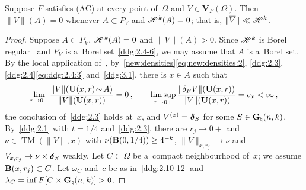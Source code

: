 \documentclass[a4paper,twoside,leqno]{article}
\newcommand{\Gk}{\pgrass{\adim}{\vdim}}        %
\DeclareMathOperator{\TM}{TM}                   %
\begin{document}
\begin{lemma}
    \label{ddg:3.4}
    Suppose $F$ satisfies (AC) at every point of~$\Omega$ and $V \in \mathbf{V}_F(\Omega)$. Then
    $\|V\|(A) = 0$ whenever $A \subset P_V$ and $\mathscr{H}^{k}(A) = 0$; that is, $\|\overline V\|
    \ll \mathscr{H}^{k}$.
\end{lemma}

\begin{proof}
    Suppose $A \subset P_V$, $\mathscr{H}^{k}(A) = 0$ and $\|V\|(A) > 0$. Since $\mathscr{H}^{k}$ is Borel
    regular~\cite[2.8(1)]{Allard1972} and $P_V$ is a~Borel set~\ref{ddg:2.4-6}, we may assume that
    $A$ is a~Borel set. By the local application of~\cite[2.8.18, 2.9.11]{Federer1969},
    by~\ref{new:densities}\eqref{eq:new:densities:2}, \ref{ddg:2.3}, \ref{ddg:2.4}\eqref{eq:ddg:2.4:3}
    and~\ref{ddg:3.1}, there is $x \in A$ such that
    \begin{equation}
        \label{eq:ddg:3.4:1}
        \lim_{r \to 0+} \frac{\|V\|(\mathbf{U}(x,r) \!\sim\! A)}{\|V\|(\mathbf{U}(x,r))} = 0 \,, \qquad
        \limsup_{r \to 0+} \frac{\|\delta_F V\|(\mathbf{U}(x,r))}{\|V\|(\mathbf{U}(x,r))} = c_x < \infty
        \,,
    \end{equation}
    the conclusion of~\ref{ddg:2.3} holds at~$x$, and $V^{(x)} = \boldsymbol{\delta}_{S}$ for some $S \in \Gk$.
    By~\ref{ddg:2.1} with $t = 1/4$ and~\ref{ddg:2.3}, there are $r_j \to 0+$ and $\nu \in
    \TM(\|V\|,x)$ with $\nu(\mathbf{B}(0,1/4)) \ge 4^{-k}$, $\|V\|_{x,r_j} \to \nu$ and $V_{x,r_j}
    \to \nu \times \boldsymbol{\delta}_{S}$ weakly. Let $C \subset \Omega$ be a~compact neighbourhood of~$x$; we
    assume $\mathbf{B}(x,r_j) \subset C$. Let $\omega_C$ and~$c$ be as in~\ref{ddg:2.10-12} and
    $\lambda_C = \inf F[C \times \Gk] > 0$.


\end{proof}
\end{document}
